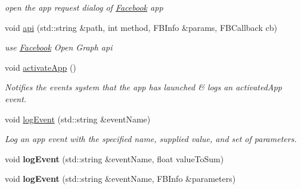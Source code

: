 \begin{DoxyCompactItemize}
\begin{DoxyCompactList}\small\item\em open the app request dialog of \hyperlink{interfaceFacebook}{Facebook} app \end{DoxyCompactList}\item 
void \hyperlink{classcocos2d_1_1plugin_1_1FacebookAgent_a4b2a329f4002c8990bffee534303a4b5}{api} (std\+::string \&path, int method, F\+B\+Info \&params, F\+B\+Callback cb)
\begin{DoxyCompactList}\small\item\em use \hyperlink{interfaceFacebook}{Facebook} Open Graph api \end{DoxyCompactList}\item 
\mbox{\label{classcocos2d_1_1plugin_1_1FacebookAgent_ac6ff42525ee65ccec5dbbb9c702170ca}} 
void \hyperlink{classcocos2d_1_1plugin_1_1FacebookAgent_ac6ff42525ee65ccec5dbbb9c702170ca}{activate\+App} ()
\begin{DoxyCompactList}\small\item\em Notifies the events system that the app has launched \& logs an activated\+App event. \end{DoxyCompactList}\item 
\mbox{\label{classcocos2d_1_1plugin_1_1FacebookAgent_acb991c98ce9a9d79374122b827ffb3ce}} 
void \hyperlink{classcocos2d_1_1plugin_1_1FacebookAgent_acb991c98ce9a9d79374122b827ffb3ce}{log\+Event} (std\+::string \&event\+Name)
\begin{DoxyCompactList}\small\item\em Log an app event with the specified name, supplied value, and set of parameters. \end{DoxyCompactList}\item 
\mbox{\label{classcocos2d_1_1plugin_1_1FacebookAgent_a84cac73a212ae117d9ac99693ba8a651}} 
void {\bfseries log\+Event} (std\+::string \&event\+Name, float value\+To\+Sum)
\item 
\mbox{\label{classcocos2d_1_1plugin_1_1FacebookAgent_ac2daa411d02b8969de8940899ee71125}} 
void {\bfseries log\+Event} (std\+::string \&event\+Name, F\+B\+Info \&parameters)
\item 
\mbox{\label{classcocos2d_1_1plugin_1_1FacebookAgent_aadddf1fda6ade45f3a75ee168dbd2fb6}} 

\end{DoxyCompactItemize}
